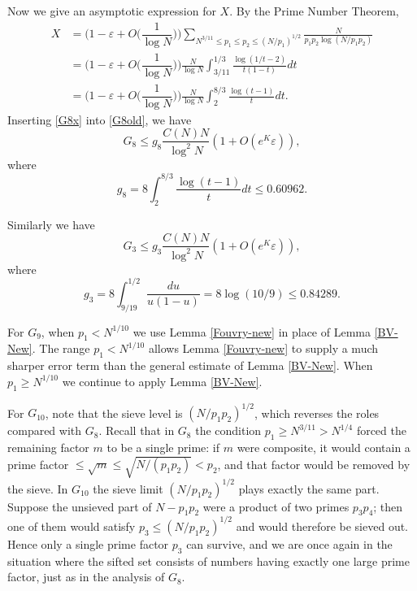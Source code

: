 \documentclass[12pt, a4paper]{amsart}
\def\le{\leqslant}
\def\ge{\geqslant}
\theoremstyle{plain}
\theoremstyle{remark}
\numberwithin{equation}{section}
\begin{document}
Now we give an asymptotic expression for  $X$. By the Prime Number Theorem,
	\begin{equation}\label{G8x}
	\begin{aligned}
	X &= \bigg(1-\varepsilon+O\bigg(\dfrac{1}{\log N}\bigg)\bigg) \sum_{N^{3/11} \leqslant p_1 \le p_2 \le (N/p_1)^{1/2}} \frac{N}{p_1p_2 \log(N/p_1p_2)} \\
	&= \bigg(1-\varepsilon+O\bigg(\dfrac{1}{\log N}\bigg)\bigg) \frac{N}{\log N} \int_{3/11}^{1/3} \frac{\log(1/t - 2)}{t(1 - t)}dt \\
	&= \bigg(1-\varepsilon+O\bigg(\dfrac{1}{\log N}\bigg)\bigg) \frac{N}{\log N} \int_{2}^{8/3} \frac{\log(t - 1)}{t} dt. 
	\end{aligned}
	\end{equation}
Inserting \eqref{G8x} into \eqref{G8old}, we have
\begin{equation}\label{G8}
G_8 \le g_8\dfrac{C(N)N}{\log^2 N}(1+O(e^K\varepsilon)),
\end{equation}
where 
\begin{equation}\label{g8}
g_{8}=8\int_{2}^{8/3} \frac{\log(t - 1)}{t} dt
\le 0.60962.
\end{equation}

Similarly we have
\begin{equation}\label{G3}
G_3 \le g_3 \frac{C(N)N}{\log^2 N} (1+O(e^K\varepsilon)), 
\end{equation}
where 
\begin{equation}\label{g3}
g_{3}
= 8\int_{9/19}^{1/2} \frac{du}{u(1-u)} 
=8\log(10/9)\le 0.84289. 
\end{equation}

For $G_9$, when $p_1 < N^{1/10}$ we use Lemma \ref{Fouvry-new} in place of Lemma \ref{BV-New}.  
The range $p_1 < N^{1/10}$ allows Lemma \ref{Fouvry-new} to supply a much sharper error term than the general estimate of Lemma \ref{BV-New}. When $p_1 \ge N^{1/10}$ we continue to apply Lemma \ref{BV-New}.

For $G_{10}$, note that the sieve level is $(N/p_1p_2)^{1/2}$, which reverses the roles compared with $G_8$.  
Recall that in $G_8$ the condition $p_1 \ge N^{3/11} > N^{1/4}$ forced the remaining factor $m$ to be a single prime: if $m$ were composite, it would contain a prime factor $\le \sqrt{m} \le \sqrt{N/(p_1p_2)} < p_2$, and that factor would be removed by the sieve.  
In $G_{10}$ the sieve limit $(N/p_1p_2)^{1/2}$ plays exactly the same part.  
Suppose the unsieved part of $N-p_1p_2$ were a product of two primes $p_3p_4$; then one of them would satisfy $p_3 \le (N/p_1p_2)^{1/2}$ and would therefore be sieved out.  
Hence only a single prime factor $p_3$ can survive, and we are once again in the situation where the sifted set consists of numbers having exactly one large prime factor, just as in the analysis of $G_8$. 
\end{document}
